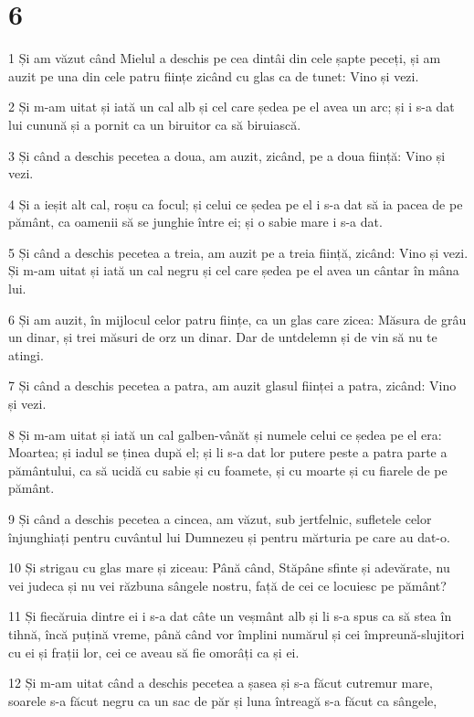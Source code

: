 \chapter{6}

\par 1 Și am văzut când Mielul a deschis pe cea dintâi din cele șapte peceți, și am auzit pe una din cele patru ființe zicând cu glas ca de tunet: Vino și vezi.
\par 2 Și m-am uitat și iată un cal alb și cel care ședea pe el avea un arc; și i s-a dat lui cunună și a pornit ca un biruitor ca să biruiască.
\par 3 Și când a deschis pecetea a doua, am auzit, zicând, pe a doua ființă: Vino și vezi.
\par 4 Și a ieșit alt cal, roșu ca focul; și celui ce ședea pe el i s-a dat să ia pacea de pe pământ, ca oamenii să se junghie între ei; și o sabie mare i s-a dat.
\par 5 Și când a deschis pecetea a treia, am auzit pe a treia ființă, zicând: Vino și vezi. Și m-am uitat și iată un cal negru și cel care ședea pe el avea un cântar în mâna lui.
\par 6 Și am auzit, în mijlocul celor patru ființe, ca un glas care zicea: Măsura de grâu un dinar, și trei măsuri de orz un dinar. Dar de untdelemn și de vin să nu te atingi.
\par 7 Și când a deschis pecetea a patra, am auzit glasul ființei a patra, zicând: Vino și vezi.
\par 8 Și m-am uitat și iată un cal galben-vânăt și numele celui ce ședea pe el era: Moartea; și iadul se ținea după el; și li s-a dat lor putere peste a patra parte a pământului, ca să ucidă cu sabie și cu foamete, și cu moarte și cu fiarele de pe pământ.
\par 9 Și când a deschis pecetea a cincea, am văzut, sub jertfelnic, sufletele celor înjunghiați pentru cuvântul lui Dumnezeu și pentru mărturia pe care au dat-o.
\par 10 Și strigau cu glas mare și ziceau: Până când, Stăpâne sfinte și adevărate, nu vei judeca și nu vei răzbuna sângele nostru, față de cei ce locuiesc pe pământ?
\par 11 Și fiecăruia dintre ei i s-a dat câte un veșmânt alb și li s-a spus ca să stea în tihnă, încă puțină vreme, până când vor împlini numărul și cei împreună-slujitori cu ei și frații lor, cei ce aveau să fie omorâți ca și ei.
\par 12 Și m-am uitat când a deschis pecetea a șasea și s-a făcut cutremur mare, soarele s-a făcut negru ca un sac de păr și luna întreagă s-a făcut ca sângele,
